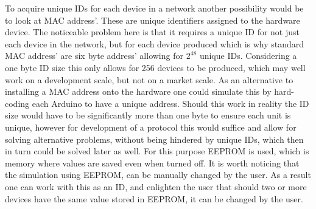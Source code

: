 To acquire unique IDs for each device in a network another possibility would be to look at MAC address'.
These are unique identifiers assigned to the hardware device.
The noticeable problem here is that it requires a unique ID for not just each device in the network, but for each device produced which is why standard MAC address' are six byte address' allowing for $2^{48}$ unique IDs.
Considering a one byte ID size this only allows for 256 devices to be produced, which may well work on a development scale, but not on a market scale.
As an alternative to installing a MAC address onto the hardware one could simulate this by hard-coding each Arduino to have a unique address.
Should this work in reality the ID size would have to be significantly more than one byte to ensure each unit is unique, however for development of a protocol this would suffice and allow for solving alternative problems, without being hindered by unique IDs, which then in turn could be solved later as well.
For this purpose EEPROM is used, which is memory where values are saved even when turned off.
It is worth noticing that the simulation using EEPROM, can be manually changed by the user. 
As a result one can work with this as an ID, and enlighten the user that should two or more devices have the same value stored in EEPROM, it can be changed by the user.
